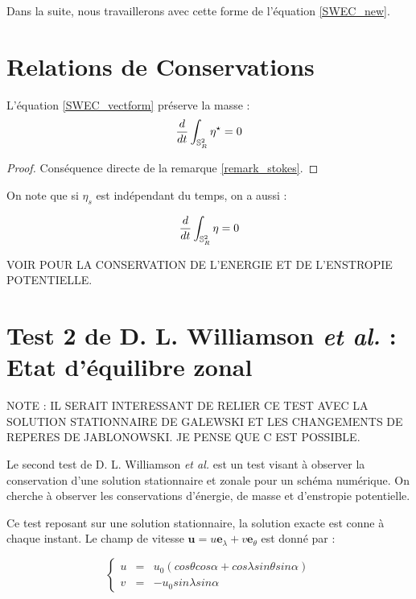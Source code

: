 Dans la suite, nous travaillerons avec cette forme de l'équation \eqref{SWEC_new}.


\section{Relations de Conservations}

\begin{proposition}
L'équation \eqref{SWEC_vectform} préserve la masse :
\begin{equation}
\dfrac{d}{dt}\displaystyle\int_{\mathbb{S}_R^2} \eta^{\star} = 0
\end{equation}
\end{proposition}

\begin{proof}
Conséquence directe de la remarque \ref{remark_stokes}.
\end{proof}

\begin{remarque}
On note que si $\eta_s$ est indépendant du temps, on a aussi :

\begin{equation}
\dfrac{d}{dt}\displaystyle\int_{\mathbb{S}_R^2} \eta = 0
\end{equation}
\end{remarque}

VOIR POUR LA CONSERVATION DE L'ENERGIE ET DE L'ENSTROPIE POTENTIELLE.


\section{Test 2 de D. L. Williamson \textit{et al.} : Etat d'équilibre zonal}

NOTE : IL SERAIT INTERESSANT DE RELIER CE TEST AVEC LA SOLUTION STATIONNAIRE DE GALEWSKI ET LES CHANGEMENTS DE REPERES DE JABLONOWSKI. JE PENSE QUE C EST POSSIBLE.

Le second test de D. L. Williamson \textit{et al.} \cite{Williamson1992} est un test visant à observer la conservation d'une solution stationnaire et zonale pour un schéma numérique. On cherche à observer les conservations d'énergie, de masse et d'enstropie potentielle.

Ce test reposant sur une solution stationnaire, la solution exacte est conne à chaque instant. Le champ de vitesse $\mathbf{u} = u \mathbf{e}_{\lambda} + v \mathbf{e}_{\theta}$ est donné par :

\begin{equation}
\left\lbrace
\begin{array}{rcl}
u & = & u_0 \left( cos \theta cos \alpha + cos \lambda sin \theta sin \alpha \right)\\
v & = & - u_0 sin \lambda sin \alpha
\end{array}
\right.
\end{equation}

